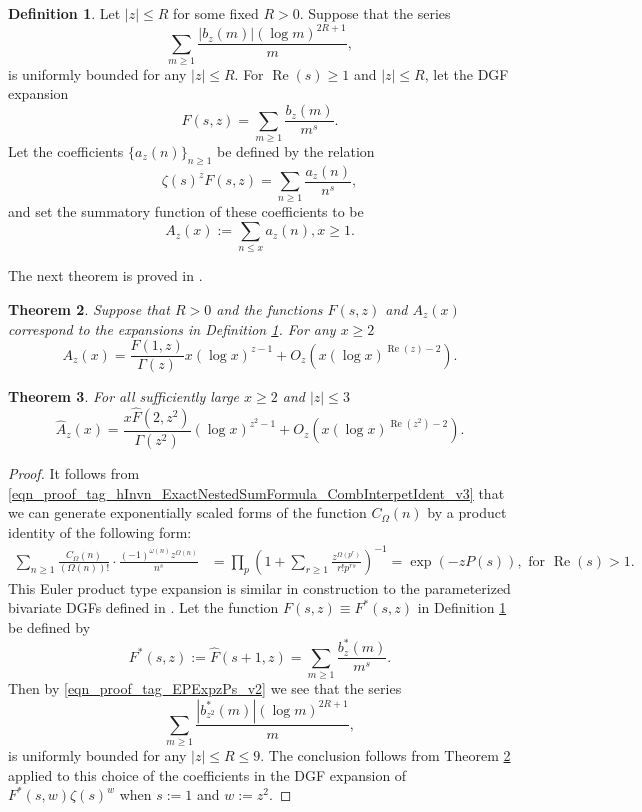 \documentclass[11pt,reqno,a4letter]{article}
\newcommand{\hlocalref}[1]{\hyperref[#1]{\ref{#1}}}
\numberwithin{equation}{section}
\numberwithin{figure}{section}
\numberwithin{table}{section}
\newcommand{\cf}{\textit{cf.\ }}
\theoremstyle{plain}
\newtheorem{theorem}{Theorem}
\numberwithin{theorem}{section}
\theoremstyle{definition}
\newtheorem{definition}[theorem]{Definition}
\renewcommand{\Re}{\operatorname{Re}}
\begin{document}
\begin{definition}
\label{def_MV_SelbergDelange}
Let $|z| \leq R$ for some fixed $R > 0$. 
Suppose that the series 
\[
\sum_{m \geq 1} \frac{|b_z(m)| (\log m)^{2R+1}}{m}, 
\]
is uniformly bounded for any $|z| \leq R$. For $\Re(s) \geq 1$ and $|z| \leq R$, let the 
DGF expansion 
\[
F(s, z) = \sum_{m \geq 1} \frac{b_z(m)}{m^s}. 
\]
Let the coefficients $\{a_z(n)\}_{n \geq 1}$ be defined by the relation 
\[
\zeta(s)^z F(s, z) = \sum_{n \geq 1} \frac{a_z(n)}{n^s}, 
\]
and set the summatory function of these coefficients to be 
\[
A_z(x) := \sum_{n \leq x} a_z(n), x \geq 1. 
\]
\end{definition}

The next theorem is proved in \cite[\S 7.4]{MV}.

\begin{theorem}
\label{theorem_MV_SelbergDelange}
Suppose that $R > 0$ and the functions $F(s, z)$ and $A_z(x)$ correspond to the expansions in 
Definition \hlocalref{def_MV_SelbergDelange}. 
For any $x \geq 2$
\[
A_z(x) = \frac{F(1, z)}{\Gamma(z)} x (\log x)^{z-1} + O_z\left(x (\log x)^{\Re(z) - 2}\right). 
\]
\end{theorem}

\begin{theorem} 
\label{prop_HatAzx_ModSummatoryFuncExps_RelatedToCkn} 
For all sufficiently large $x \geq 2$ and $|z| \leq 3$ 
\[
\widehat{A}_z(x) = \frac{x \widehat{F}(2, z^2)}{\Gamma(z^2)} (\log x)^{z^2-1} + 
     O_{z}\left(x (\log x)^{\Re(z^2) - 2}\right). 
\]
\end{theorem} 
\begin{proof} 
It follows from \eqref{eqn_proof_tag_hInvn_ExactNestedSumFormula_CombInterpetIdent_v3} that 
we can generate exponentially scaled forms of the function $C_{\Omega}(n)$ by 
a product identity of the following form: 
\begin{align} 
\label{eqn_proof_tag_EPExpzPs_v2}
\sum_{n \geq 1} \frac{C_{\Omega}(n)}{(\Omega(n))!} \cdot 
     \frac{(-1)^{\omega(n)} z^{\Omega(n)}}{n^s} & = \prod_p \left(1 + \sum_{r \geq 1} 
     \frac{z^{\Omega(p^r)}}{r! p^{rs}}\right)^{-1} 
     = \exp\left(-z P(s)\right), \text{ for } \Re(s) > 1. 
\end{align} 
This Euler product type expansion is similar in construction to the parameterized bivariate 
DGFs defined in \cite[\S 7.4]{MV} \cite[\cf \S II.6.1]{TENENBAUM-PROBNUMT-METHODS}.
Let the function $F(s, z) \equiv F^{\ast}(s, z)$ in 
Definition \hlocalref{def_MV_SelbergDelange} 
be defined by 
\[
F^{\ast}(s, z) := \widehat{F}(s+1, z) = \sum_{m \geq 1} \frac{b_z^{\ast}(m)}{m^s}. 
\]
Then by \eqref{eqn_proof_tag_EPExpzPs_v2} we see that the series 
\[
\sum_{m \geq 1} \frac{|b_{z^2}^{\ast}(m)| (\log m)^{2R+1}}{m}, 
\]
is uniformly bounded for any $|z| \leq R \leq 9$. 
The conclusion follows from 
Theorem \hlocalref{theorem_MV_SelbergDelange} 
applied to this choice of the coefficients in the DGF expansion of 
$F^{\ast}(s, w) \zeta(s)^{w}$ when $s := 1$ and $w := z^2$. 
\end{proof} 
\end{document}
